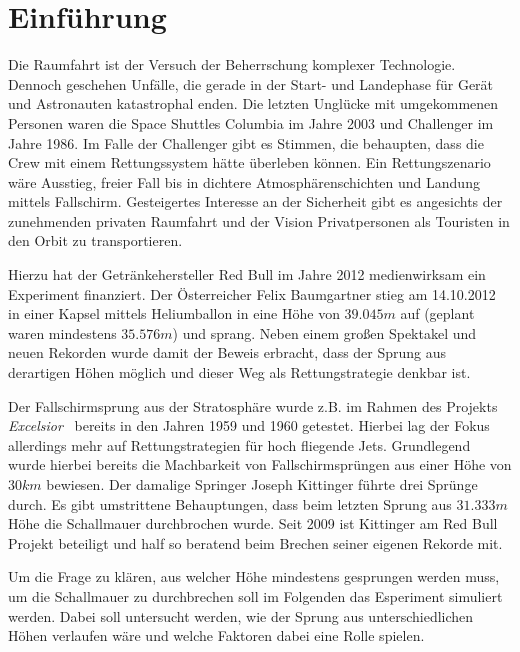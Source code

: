 \newpage

\section{Einführung}

Die Raumfahrt ist der Versuch der Beherrschung komplexer Technologie.
Dennoch geschehen Unfälle, die gerade in der Start- und Landephase für Gerät und Astronauten katastrophal enden.
Die letzten Unglücke mit umgekommenen Personen waren die Space Shuttles Columbia im Jahre 2003 und Challenger im Jahre 1986.
Im Falle der Challenger gibt es Stimmen, die behaupten, dass die Crew mit einem Rettungssystem hätte überleben können.
Ein Rettungszenario wäre Ausstieg, freier Fall bis in dichtere Atmosphärenschichten und Landung mittels Fallschirm.
Gesteigertes Interesse an der Sicherheit gibt es angesichts der zunehmenden privaten Raumfahrt und der Vision Privatpersonen als Touristen in den Orbit zu transportieren.

Hierzu hat der Getränkehersteller Red Bull im Jahre 2012 medienwirksam ein Experiment finanziert.
Der Österreicher Felix Baumgartner stieg am 14.10.2012 in einer Kapsel mittels Heliumballon in eine Höhe von $39.045m$ auf (geplant waren mindestens $35.576m$) und sprang.
Neben einem großen Spektakel und neuen Rekorden wurde damit der Beweis erbracht, dass der Sprung aus derartigen Höhen möglich und dieser Weg als Rettungstrategie denkbar ist.

Der Fallschirmsprung aus der Stratosphäre wurde z.B. im Rahmen des Projekts \emph{Excelsior}~\cite{af.mil:excelsior} bereits in den Jahren 1959 und 1960 getestet.
Hierbei lag der Fokus allerdings mehr auf Rettungstrategien für hoch fliegende Jets.
Grundlegend wurde hierbei bereits die Machbarkeit von Fallschirmsprüngen aus einer Höhe von $30km$ bewiesen.
Der damalige Springer Joseph Kittinger führte drei Sprünge durch.
Es gibt umstrittene Behauptungen, dass beim letzten Sprung aus $31.333m$ Höhe die Schallmauer durchbrochen wurde.
Seit 2009 ist Kittinger am Red Bull Projekt beteiligt und half so beratend beim Brechen seiner eigenen Rekorde mit.

Um die Frage zu klären, aus welcher Höhe mindestens gesprungen werden muss, um die Schallmauer zu durchbrechen soll im Folgenden das Esperiment simuliert werden.
Dabei soll untersucht werden, wie der Sprung aus unterschiedlichen Höhen verlaufen wäre und welche Faktoren dabei eine Rolle spielen.


